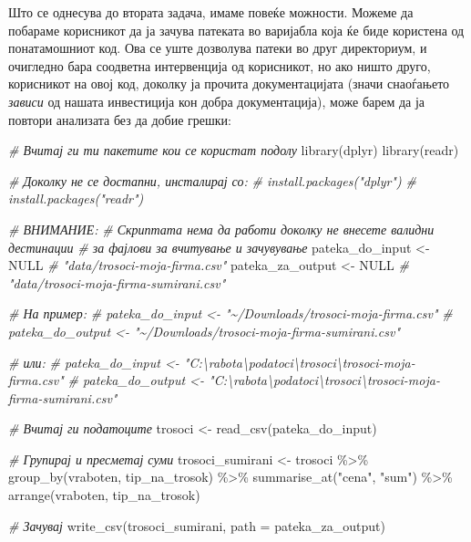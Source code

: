 \documentclass[
]{book}
\newenvironment{Shaded}{\begin{snugshade}}{\end{snugshade}}
\newcommand{\AttributeTok}[1]{\textcolor[rgb]{0.77,0.63,0.00}{#1}}
\newcommand{\CommentTok}[1]{\textcolor[rgb]{0.56,0.35,0.01}{\textit{#1}}}
\newcommand{\ConstantTok}[1]{\textcolor[rgb]{0.00,0.00,0.00}{#1}}
\newcommand{\FunctionTok}[1]{\textcolor[rgb]{0.00,0.00,0.00}{#1}}
\newcommand{\NormalTok}[1]{#1}
\newcommand{\OtherTok}[1]{\textcolor[rgb]{0.56,0.35,0.01}{#1}}
\newcommand{\SpecialCharTok}[1]{\textcolor[rgb]{0.00,0.00,0.00}{#1}}
\newcommand{\StringTok}[1]{\textcolor[rgb]{0.31,0.60,0.02}{#1}}
\begin{document}
Што се однесува до втората задача, имаме повеќе можности. Можеме да побараме корисникот да ја зачува патеката во варијабла која ќе биде користена од понатамошниот код. Ова се уште дозволува патеки во друг директориум, и очигледно бара соодветна интервенција од корисникот, но ако ништо друго, корисникот на овој код, доколку ја прочита документацијата (значи снаоѓањето \emph{зависи} од нашата инвестиција кон добра документација), може барем да ја повтори анализата без да добие грешки:

\begin{Shaded}
\begin{Highlighting}[]
\CommentTok{\# Вчитај ги ти пакетите кои се користат подолу }
\FunctionTok{library}\NormalTok{(dplyr)}
\FunctionTok{library}\NormalTok{(readr)}

\CommentTok{\# Доколку не се достапни, инсталирај со:}
\CommentTok{\# install.packages("dplyr")}
\CommentTok{\# install.packages("readr")}

\CommentTok{\# ВНИМАНИЕ:}
\CommentTok{\# Скриптата нема да работи доколку не внесете валидни дестинации}
\CommentTok{\# за фајлови за вчитување и зачувување}
\NormalTok{pateka\_do\_input }\OtherTok{\textless{}{-}} \ConstantTok{NULL} \CommentTok{\# "data/trosoci{-}moja{-}firma.csv"}
\NormalTok{pateka\_za\_output }\OtherTok{\textless{}{-}} \ConstantTok{NULL} \CommentTok{\# "data/trosoci{-}moja{-}firma{-}sumirani.csv"}

\CommentTok{\# На пример:}
\CommentTok{\# pateka\_do\_input \textless{}{-} "\textasciitilde{}/Downloads/trosoci{-}moja{-}firma.csv" }
\CommentTok{\# pateka\_do\_output \textless{}{-} "\textasciitilde{}/Downloads/trosoci{-}moja{-}firma{-}sumirani.csv" }

\CommentTok{\# или:}
\CommentTok{\# pateka\_do\_input \textless{}{-} "C:\textbackslash{}rabota\textbackslash{}podatoci\textbackslash{}trosoci\textbackslash{}trosoci{-}moja{-}firma.csv"}
\CommentTok{\# pateka\_do\_output \textless{}{-} "C:\textbackslash{}rabota\textbackslash{}podatoci\textbackslash{}trosoci\textbackslash{}trosoci{-}moja{-}firma{-}sumirani.csv"}

\CommentTok{\# Вчитај ги податоците}
\NormalTok{trosoci }\OtherTok{\textless{}{-}} \FunctionTok{read\_csv}\NormalTok{(pateka\_do\_input)}

\CommentTok{\# Групирај и пресметај суми}
\NormalTok{trosoci\_sumirani }\OtherTok{\textless{}{-}}\NormalTok{ trosoci }\SpecialCharTok{\%\textgreater{}\%} 
  \FunctionTok{group\_by}\NormalTok{(vraboten, tip\_na\_trosok) }\SpecialCharTok{\%\textgreater{}\%} 
  \FunctionTok{summarise\_at}\NormalTok{(}\StringTok{"cena"}\NormalTok{, }\StringTok{"sum"}\NormalTok{) }\SpecialCharTok{\%\textgreater{}\%} 
  \FunctionTok{arrange}\NormalTok{(vraboten, tip\_na\_trosok)}

\CommentTok{\# Зачувај}
\FunctionTok{write\_csv}\NormalTok{(trosoci\_sumirani, }
          \AttributeTok{path =}\NormalTok{ pateka\_za\_output)}
\end{Highlighting}
\end{Shaded}
\end{document}
